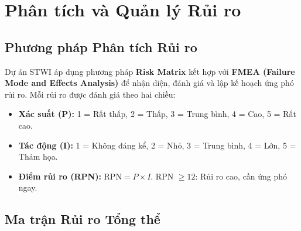 \chapter{Phân tích và Quản lý Rủi ro}

\section{Phương pháp Phân tích Rủi ro}

Dự án STWI áp dụng phương pháp \textbf{Risk Matrix} kết hợp với \textbf{FMEA (Failure Mode and Effects Analysis)} để nhận diện, đánh giá và lập kế hoạch ứng phó rủi ro. Mỗi rủi ro được đánh giá theo hai chiều:

\begin{itemize}[itemsep=3pt]
  \item \textbf{Xác suất (P):} 1 = Rất thấp, 2 = Thấp, 3 = Trung bình, 4 = Cao, 5 = Rất cao.
  \item \textbf{Tác động (I):} 1 = Không đáng kể, 2 = Nhỏ, 3 = Trung bình, 4 = Lớn, 5 = Thảm họa.
  \item \textbf{Điểm rủi ro (RPN):} $\text{RPN} = P \times I$. RPN $\geq 12$: Rủi ro cao, cần ứng phó ngay.
\end{itemize}

\section{Ma trận Rủi ro Tổng thể}

